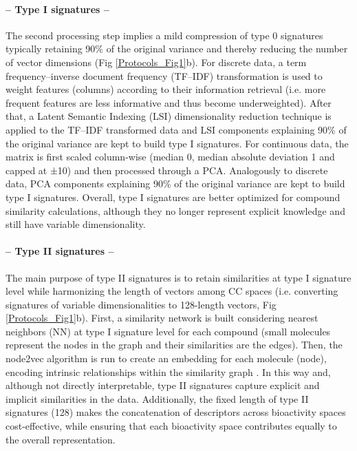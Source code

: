 \paragraph{-- Type I signatures --} \leavevmode

The second processing step implies a mild compression of type 0 signatures typically retaining 90\% of the original variance and thereby reducing the number of vector dimensions (Fig \ref{Protocols_Fig1}b). For discrete data, a term frequency–inverse document frequency (TF–IDF) transformation is used to weight features (columns) according to their information retrieval (i.e. more frequent features are less informative and thus become underweighted). After that, a Latent Semantic Indexing (LSI) dimensionality reduction technique is applied to the TF–IDF transformed data and LSI components explaining 90\% of the original variance are kept to build type I signatures. For continuous data, the matrix is first scaled column-wise (median 0, median absolute deviation 1 and capped at ±10) and then processed through a PCA. Analogously to discrete data, PCA components explaining 90\% of the original variance are kept to build type I signatures. Overall, type I signatures are better optimized for compound similarity calculations, although they no longer represent explicit knowledge and still have variable dimensionality.  

\paragraph{-- Type II signatures --} \leavevmode

The main purpose of type II signatures is to retain similarities at type I signature level while harmonizing the length of vectors among CC spaces (i.e. converting signatures of variable dimensionalities to 128-length vectors, Fig \ref{Protocols_Fig1}b). First, a similarity network is built considering nearest neighbors (NN) at type I signature level for each compound (small molecules represent the nodes in the graph and their similarities are the edges). Then, the node2vec algorithm is run to create an embedding for each molecule (node), encoding intrinsic relationships within the similarity graph \cite{grover_2016}. In this way and, although not directly interpretable, type II signatures capture explicit and implicit similarities in the data. Additionally, the fixed length of type II signatures (128) makes the concatenation of descriptors across bioactivity spaces cost-effective, while ensuring that each bioactivity space contributes equally to the overall representation.  


